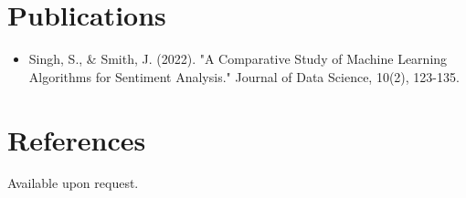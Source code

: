 \documentclass[a4paper,10pt]{article}
\begin{document}
\section{Publications}
\begin{itemize}[leftmargin=0.15in]
    \item Singh, S., \& Smith, J. (2022). "A Comparative Study of Machine Learning Algorithms for Sentiment Analysis." Journal of Data Science, 10(2), 123-135.
\end{itemize}

\section{References}
Available upon request.
\end{document}
